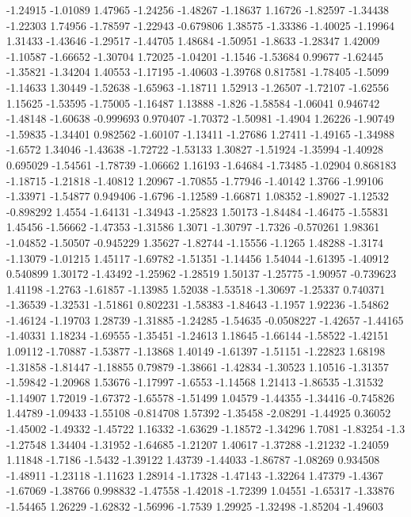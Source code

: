 \documentclass[9pt]{article}
\theoremstyle{plain}
\theoremstyle{definition}
\theoremstyle{remark}
\numberwithin{equation}{section}
\begin{document}
-1.24915
-1.01089
1.47965
-1.24256
-1.48267
-1.18637
1.16726
-1.82597
-1.34438
-1.22303
1.74956
-1.78597
-1.22943
-0.679806
1.38575
-1.33386
-1.40025
-1.19964
1.31433
-1.43646
-1.29517
-1.44705
1.48684
-1.50951
-1.8633
-1.28347
1.42009
-1.10587
-1.66652
-1.30704
1.72025
-1.04201
-1.1546
-1.53684
0.99677
-1.62445
-1.35821
-1.34204
1.40553
-1.17195
-1.40603
-1.39768
0.817581
-1.78405
-1.5099
-1.14633
1.30449
-1.52638
-1.65963
-1.18711
1.52913
-1.26507
-1.72107
-1.62556
1.15625
-1.53595
-1.75005
-1.16487
1.13888
-1.826
-1.58584
-1.06041
0.946742
-1.48148
-1.60638
-0.999693
0.970407
-1.70372
-1.50981
-1.4904
1.26226
-1.90749
-1.59835
-1.34401
0.982562
-1.60107
-1.13411
-1.27686
1.27411
-1.49165
-1.34988
-1.6572
1.34046
-1.43638
-1.72722
-1.53133
1.30827
-1.51924
-1.35994
-1.40928
0.695029
-1.54561
-1.78739
-1.06662
1.16193
-1.64684
-1.73485
-1.02904
0.868183
-1.18715
-1.21818
-1.40812
1.20967
-1.70855
-1.77946
-1.40142
1.3766
-1.99106
-1.33971
-1.54877
0.949406
-1.6796
-1.12589
-1.66871
1.08352
-1.89027
-1.12532
-0.898292
1.4554
-1.64131
-1.34943
-1.25823
1.50173
-1.84484
-1.46475
-1.55831
1.45456
-1.56662
-1.47353
-1.31586
1.3071
-1.30797
-1.7326
-0.570261
1.98361
-1.04852
-1.50507
-0.945229
1.35627
-1.82744
-1.15556
-1.1265
1.48288
-1.3174
-1.13079
-1.01215
1.45117
-1.69782
-1.51351
-1.14456
1.54044
-1.61395
-1.40912
0.540899
1.30172
-1.43492
-1.25962
-1.28519
1.50137
-1.25775
-1.90957
-0.739623
1.41198
-1.2763
-1.61857
-1.13985
1.52038
-1.53518
-1.30697
-1.25337
0.740371
-1.36539
-1.32531
-1.51861
0.802231
-1.58383
-1.84643
-1.1957
1.92236
-1.54862
-1.46124
-1.19703
1.28739
-1.31885
-1.24285
-1.54635
-0.0508227
-1.42657
-1.44165
-1.40331
1.18234
-1.69555
-1.35451
-1.24613
1.18645
-1.66144
-1.58522
-1.42151
1.09112
-1.70887
-1.53877
-1.13868
1.40149
-1.61397
-1.51151
-1.22823
1.68198
-1.31858
-1.81447
-1.18855
0.79879
-1.38661
-1.42834
-1.30523
1.10516
-1.31357
-1.59842
-1.20968
1.53676
-1.17997
-1.6553
-1.14568
1.21413
-1.86535
-1.31532
-1.14907
1.72019
-1.67372
-1.65578
-1.51499
1.04579
-1.44355
-1.34416
-0.745826
1.44789
-1.09433
-1.55108
-0.814708
1.57392
-1.35458
-2.08291
-1.44925
0.36052
-1.45002
-1.49332
-1.45722
1.16332
-1.63629
-1.18572
-1.34296
1.7081
-1.83254
-1.3
-1.27548
1.34404
-1.31952
-1.64685
-1.21207
1.40617
-1.37288
-1.21232
-1.24059
1.11848
-1.7186
-1.5432
-1.39122
1.43739
-1.44033
-1.86787
-1.08269
0.934508
-1.48911
-1.23118
-1.11623
1.28914
-1.17328
-1.47143
-1.32264
1.47379
-1.4367
-1.67069
-1.38766
0.998832
-1.47558
-1.42018
-1.72399
1.04551
-1.65317
-1.33876
-1.54465
1.26229
-1.62832
-1.56996
-1.7539
1.29925
-1.32498
-1.85204
-1.49603
\end{document}
